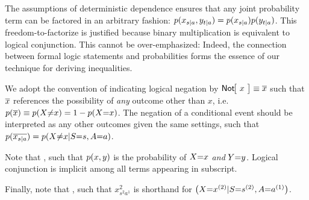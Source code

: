 The assumptions of deterministic dependence ensures that any  joint probability term can be factored in an arbitrary fashion: $\p{x_{s|a} , y_{t|a}}=\p{x_{s|a}}\p{y_{t|a}}$. This freedom-to-factorize is justified because binary multiplication is equivalent to logical conjunction. This cannot be over-emphasized:  Indeed, the connection between formal logic statements and probabilities forms the essence of our technique for deriving inequalities.



We adopt the convention of indicating logical negation by $\NamedFunction{Not}{\!x\!}\equiv\n{x}$ such that $\n{x}$ references the possibility of \emph{any} outcome other than $x$, i.e. $\p{\n{x}}\equiv\p{X\cramp{\neq}x}=1-\p{X\cramp{=}x}$. The negation of a conditional event should be interpreted as any other outcomes given the same settings, such that $\p{\n{x_{s|a}}}=\p{X\cramp{\neq}x|S\cramp{=}s,A\cramp{=}a}$.

Note that , such that $\p{x,y}$ is the probability of $X\cramp{=}x$ \emph{and} $Y\cramp{=}y$. Logical conjunction is implicit among all terms appearing in subscript.

Finally, note that , such that $x^2_{s^2 a^1}$ is shorthand for $\parens*{X\cramp{=}x^{(2)}|S\cramp{=}s^{(2)},A\cramp{=}a^{(1)}}$. 



